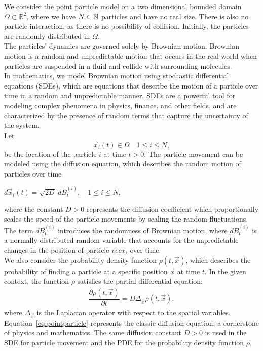 We consider the point particle model on a two dimensional bounded domain $\Omega \subset \mathbb{R}^2$, where we have $N \in \mathbb{N}$ particles and have no real size.
There is also no particle interaction, as there is no possibility of collision. 
Initially, the particles are randomly distributed in $\Omega$. \\
The particles' dynamics are governed solely by Brownian motion.
Brownian motion is a random and unpredictable motion that occurs in the real world when particles are suspended in a fluid and collide with surrounding molecules. \\
In mathematics, we model Brownian motion using stochastic differential equations (SDEs), which are equations that describe the motion of a particle over time in a random and unpredictable manner. 
SDEs are a powerful tool for modeling complex phenomena in physics, finance, and other fields, and are characterized by the presence of random terms that capture the uncertainty of the system. \\
Let 
\[\vec{x}_i(t) \in \Omega \quad 1 \leq i \leq N,\]
be the location of the particle $i$ at time $t > 0$. 
The particle movement can be modeled using the diffusion equation, which describes the random motion of particles over time
\begin{center}
	$d\vec{x}_i(t) = \sqrt{2D} \: dB_t^{(i)}, \quad 1 \leq i \leq N$,
\end{center}
where the constant $D > 0$ represents the diffusion coefficient which proportionally scales the speed of the particle movements by scaling the random fluctuations.
The term $dB_t^{(i)}$ introduces the randomness of Brownian motion, where $dB_t^{(i)}$ is a normally distributed random variable that accounts for the unpredictable changes in the position of particle $vec{x}_i$ over time. \\
We also consider the probability density function $\rho(t, \vec{x})$, which describes the probability of finding a particle at a specific position $\vec{x}$ at time $t$.
In the given context, the function $\rho$ satisfies the partial differential equation:
\begin{align}
	\dfrac{\partial \rho (t, \vec{x})}{\partial t} = D \Delta_{\vec{x}} \rho(t, \vec{x}) \label{eq:pointparticle}, 
\end{align}
where $\Delta_{\vec{x}}$ is the Laplacian operator with respect to the spatial variables. \\
Equation~\eqref{eq:pointparticle} represents the classic diffusion equation, a cornerstone of physics and mathematics.
The same diffusion constant $D>0$ is used in the SDE for particle movement and the PDE for the probability density function $\rho$. \\



